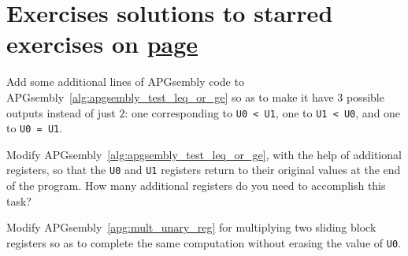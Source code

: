 \section*{Exercises \hfill \normalfont\textsf{\small solutions to starred exercises on \hyperlink{solutions_universal_computation}{page \pageref{solutions_universal_computation}}}}
\label{sec:solutions_universal_computation}
\vspace*{-0.4cm}\hrulefill\vspace*{-0.3cm}\footnotesize\begin{multicols}{2}\vspace*{-0.4cm}\raggedcolumns{}
	\setlength{\parskip}{0pt}
	
	
	\begin{problem}\label{exer:universal_computation_apgsembly_le_ge_eq}
		Add some additional lines of APGsembly code to APGsembly~\ref{alg:apgsembly_test_leq_or_ge} so as to make it have $3$ possible outputs instead of just $2$: one corresponding to \texttt{U0 < U1}, one to \texttt{U1 < U0}, and one to \texttt{U0 = U1}.
	\end{problem}
	
	
	\mfilbreak
	
	
	\begin{problem}\label{exer:universal_computation_apgsembly_leq_ge_reset}
		Modify APGsembly~\ref{alg:apgsembly_test_leq_or_ge}, with the help of additional registers, so that the \texttt{U0} and \texttt{U1} registers return to their original values at the end of the program. How many additional registers do you need to accomplish this task?
	\end{problem}
	
	
	\mfilbreak
	
	
	\begin{problem}\label{exer:universal_computation_mult_preserve_r0}
		Modify APGsembly~\ref{apg:mult_unary_reg} for multiplying two sliding block registers so as to complete the same computation without erasing the value of \texttt{U0}.
		
	\end{problem}
	

\end{multicols}
